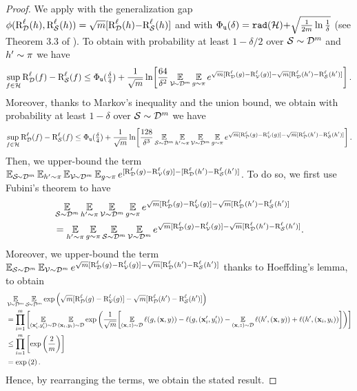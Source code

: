 \documentclass[twoside]{article}
\theoremstyle{plain}
\begin{document}
\begin{proof}
We apply  with the generalization gap $\phi(\RiskLoss_{\Dcal}(h),\RiskLoss_{\Scal}(h))=\sqrt{m}[\RiskLoss_{\Dcal}(h){-}\RiskLoss_{\Scal}(h)]$ and with $\PhiUC(\delta)=\rad(\Hcal) {+} \sqrt{\frac{1}{2m}\ln\frac{1}{\delta}}$ (see Theorem 3.3 of \citet{mohri2012foundations}). 
To obtain with probability at least $1-\delta/2$ over $\Scal\sim\Dcal^m$ and $h'\sim\P$ we have
\begin{align*}
\sup_{f\in\Hcal}\RiskLoss_{\Dcal}(f) - \RiskLoss_{\Scal}(f) \le \PhiUC(\tfrac{\delta}{4}) + \frac{1}{\sqrt{m}}\ln\!\left[\frac{64}{\delta^2} \EE_{\Vcal\!{\sim}\Dcal^m}\EE_{g{\sim}\P} e^{\sqrt{m}[\RiskLoss_{\Dcal}(g) - \RiskLoss_{\Vcal}(g)] - \sqrt{m}[\RiskLoss_{\Dcal}(h') - \RiskLoss_{\Scal}(h')]}\right].
\end{align*}
Moreover, thanks to Markov's inequality and the union bound, we obtain with probability at least $1-\delta$ over $\Scal\sim\Dcal^m$ we have
\begin{align*}
\sup_{f\in\Hcal}\RiskLoss_{\Dcal}(f) - \RiskLoss_{\Scal}(f) \le \PhiUC(\tfrac{\delta}{4}) + \frac{1}{\sqrt{m}}\ln\!\left[\frac{128}{\delta^3} \EE_{\Scal{\sim}\Dcal^m}\EE_{h'{\sim}\P}\EE_{\Vcal{\sim}\Dcal^m}\EE_{g{\sim}\P} e^{\sqrt{m}[\RiskLoss_{\Dcal}(g) - \RiskLoss_{\Vcal}(g)] - \sqrt{m}[\RiskLoss_{\Dcal}(h') - \RiskLoss_{\Scal}(h')]}\right].
\end{align*}
Then, we upper-bound the term $\EE_{\Scal\!{\sim}\Dcal^m}\EE_{h'{\sim}\P}\EE_{\Vcal\!{\sim}\Dcal^m}\EE_{g{\sim}\P} e^{[\RiskLoss_{\Dcal}(g) - \RiskLoss_{\Vcal}(g)] - [\RiskLoss_{\Dcal}(h') - \RiskLoss_{\Scal}(h')]}$.
To do so, we first use Fubini's theorem to have
\begin{align*}
&\EE_{\Scal{\sim}\Dcal^m}\EE_{h'{\sim}\P}\EE_{\Vcal{\sim}\Dcal^m}\EE_{g{\sim}\P} e^{\sqrt{m}[\RiskLoss_{\Dcal}(g) - \RiskLoss_{\Vcal}(g)] - \sqrt{m}[\RiskLoss_{\Dcal}(h') - \RiskLoss_{\Scal}(h')]}\\
&= \EE_{h'{\sim}\P}\EE_{g{\sim}\P}\EE_{\Scal{\sim}\Dcal^m}\EE_{\Vcal{\sim}\Dcal^m} e^{\sqrt{m}[\RiskLoss_{\Dcal}(g) - \RiskLoss_{\Vcal}(g)] - \sqrt{m}[\RiskLoss_{\Dcal}(h') - \RiskLoss_{\Scal}(h')]}.
\end{align*}
Moreover, we upper-bound the term $\EE_{\Scal{\sim}\Dcal^m}\EE_{\Vcal{\sim}\Dcal^m} e^{\sqrt{m}[\RiskLoss_{\Dcal}(g) - \RiskLoss_{\Vcal}(g)] - \sqrt{m}[\RiskLoss_{\Dcal}(h') - \RiskLoss_{\Scal}(h')]}$ thanks to Hoeffding's lemma, to obtain
\begin{align*}
&\EE_{\Vcal\!{\sim}\Dcal^m}\EE_{\Scal\!{\sim}\Dcal^m} \exp\LP\sqrt{m}[\RiskLoss_{\Dcal}(g) - \RiskLoss_{\Vcal}(g)] - \sqrt{m}[\RiskLoss_{\Dcal}(h') - \RiskLoss_{\Scal}(h')]\RP\\
&= \prod_{i=1}^{m}\LB \EE_{(\xbf_i',y_i')\sim\Dcal}\EE_{(\xbf_i,y_i)\sim\Dcal} \exp\LP\frac{1}{\sqrt{m}}\!\LB\EE_{(\xbf,z)\sim\Dcal}\loss(g, (\xbf,y)) - \loss(g, (\xbf'_i,y'_i)) - \EE_{(\xbf,z)\sim\Dcal}\loss(h', (\xbf,y)) + \loss(h', (\xbf_i,y_i))\RB\RP \RB\\
&\le \prod_{i=1}^{m}\LB \exp\LP\frac{2}{m}\RP\RB\\
&= \exp\LP2\RP.
\end{align*}
Hence, by rearranging the terms, we obtain the stated result.
\end{proof}
\end{document}
